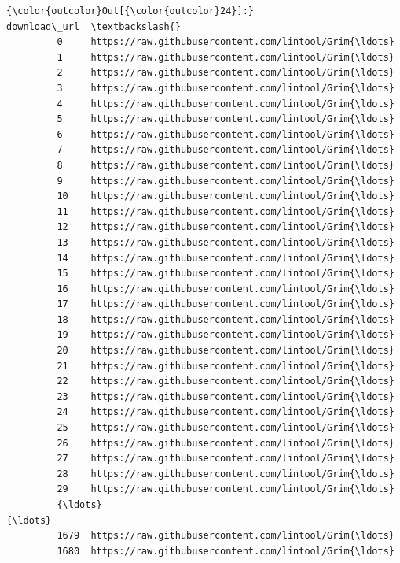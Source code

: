 \documentclass[11pt]{article}
\begin{document}
\begin{Verbatim}[commandchars=\\\{\}]
{\color{outcolor}Out[{\color{outcolor}24}]:}                                            download\_url  \textbackslash{}
         0     https://raw.githubusercontent.com/lintool/Grim{\ldots}   
         1     https://raw.githubusercontent.com/lintool/Grim{\ldots}   
         2     https://raw.githubusercontent.com/lintool/Grim{\ldots}   
         3     https://raw.githubusercontent.com/lintool/Grim{\ldots}   
         4     https://raw.githubusercontent.com/lintool/Grim{\ldots}   
         5     https://raw.githubusercontent.com/lintool/Grim{\ldots}   
         6     https://raw.githubusercontent.com/lintool/Grim{\ldots}   
         7     https://raw.githubusercontent.com/lintool/Grim{\ldots}   
         8     https://raw.githubusercontent.com/lintool/Grim{\ldots}   
         9     https://raw.githubusercontent.com/lintool/Grim{\ldots}   
         10    https://raw.githubusercontent.com/lintool/Grim{\ldots}   
         11    https://raw.githubusercontent.com/lintool/Grim{\ldots}   
         12    https://raw.githubusercontent.com/lintool/Grim{\ldots}   
         13    https://raw.githubusercontent.com/lintool/Grim{\ldots}   
         14    https://raw.githubusercontent.com/lintool/Grim{\ldots}   
         15    https://raw.githubusercontent.com/lintool/Grim{\ldots}   
         16    https://raw.githubusercontent.com/lintool/Grim{\ldots}   
         17    https://raw.githubusercontent.com/lintool/Grim{\ldots}   
         18    https://raw.githubusercontent.com/lintool/Grim{\ldots}   
         19    https://raw.githubusercontent.com/lintool/Grim{\ldots}   
         20    https://raw.githubusercontent.com/lintool/Grim{\ldots}   
         21    https://raw.githubusercontent.com/lintool/Grim{\ldots}   
         22    https://raw.githubusercontent.com/lintool/Grim{\ldots}   
         23    https://raw.githubusercontent.com/lintool/Grim{\ldots}   
         24    https://raw.githubusercontent.com/lintool/Grim{\ldots}   
         25    https://raw.githubusercontent.com/lintool/Grim{\ldots}   
         26    https://raw.githubusercontent.com/lintool/Grim{\ldots}   
         27    https://raw.githubusercontent.com/lintool/Grim{\ldots}   
         28    https://raw.githubusercontent.com/lintool/Grim{\ldots}   
         29    https://raw.githubusercontent.com/lintool/Grim{\ldots}   
         {\ldots}                                                 {\ldots}   
         1679  https://raw.githubusercontent.com/lintool/Grim{\ldots}   
         1680  https://raw.githubusercontent.com/lintool/Grim{\ldots}   

\end{Verbatim}
\end{document}
